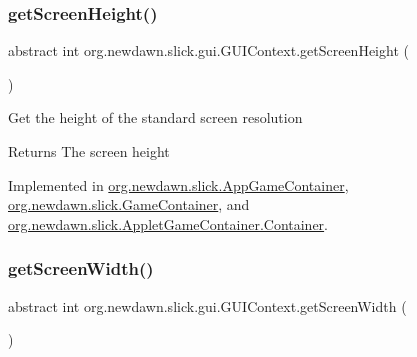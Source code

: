 \mbox{\label{interfaceorg_1_1newdawn_1_1slick_1_1gui_1_1_g_u_i_context_ad7b27d047f72ef86c1ec448492a16d6a}} 
\subsubsection{\texorpdfstring{get\+Screen\+Height()}{getScreenHeight()}}
{\footnotesize\ttfamily abstract int org.\+newdawn.\+slick.\+gui.\+G\+U\+I\+Context.\+get\+Screen\+Height (\begin{DoxyParamCaption}{ }\end{DoxyParamCaption})\hspace{0.3cm}{\ttfamily [abstract]}}

Get the height of the standard screen resolution

\begin{DoxyReturn}{Returns}
The screen height 
\end{DoxyReturn}


Implemented in \mbox{\hyperlink{classorg_1_1newdawn_1_1slick_1_1_app_game_container_add722e9c1f0175f77e41cea0d65c8e90}{org.\+newdawn.\+slick.\+App\+Game\+Container}}, \mbox{\hyperlink{classorg_1_1newdawn_1_1slick_1_1_game_container_afdb008e76bcbc6de23e783670c044f28}{org.\+newdawn.\+slick.\+Game\+Container}}, and \mbox{\hyperlink{classorg_1_1newdawn_1_1slick_1_1_applet_game_container_1_1_container_a60319d829f6ae2a5cfd74408738b2e68}{org.\+newdawn.\+slick.\+Applet\+Game\+Container.\+Container}}.

\mbox{\label{interfaceorg_1_1newdawn_1_1slick_1_1gui_1_1_g_u_i_context_abbe4c9d529ed0c3dff177021f4839389}} 
\subsubsection{\texorpdfstring{get\+Screen\+Width()}{getScreenWidth()}}
{\footnotesize\ttfamily abstract int org.\+newdawn.\+slick.\+gui.\+G\+U\+I\+Context.\+get\+Screen\+Width (\begin{DoxyParamCaption}{ }\end{DoxyParamCaption})\hspace{0.3cm}{\ttfamily [abstract]}}

